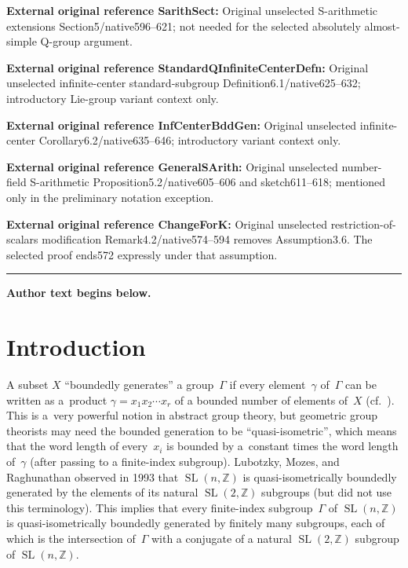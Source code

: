 \documentclass[11pt]{article}
\numberwithin{equation}{section}
\newcommand{\ZZ}{\mathbb{Z}}
\DeclareMathOperator{\SL}{SL}
\numberwithin{equation}{section}
\theoremstyle{definition}
\begin{document}
\noindent\textbf{External original reference SarithSect:} Original unselected S-arithmetic extensions Section5/native596–621; not needed for the selected absolutely almost-simple Q-group argument.\par
\noindent\textbf{External original reference StandardQInfiniteCenterDefn:} Original unselected infinite-center standard-subgroup Definition6.1/native625–632; introductory Lie-group variant context only.\par
\noindent\textbf{External original reference InfCenterBddGen:} Original unselected infinite-center Corollary6.2/native635–646; introductory variant context only.\par
\noindent\textbf{External original reference GeneralSArith:} Original unselected number-field S-arithmetic Proposition5.2/native605–606 and sketch611–618; mentioned only in the preliminary notation exception.\par
\noindent\textbf{External original reference ChangeForK:} Original unselected restriction-of-scalars modification Remark4.2/native574–594 removes Assumption3.6. The selected proof ends572 expressly under that assumption.\par
\medskip\hrule\medskip\noindent\textbf{Author text begins below.}\par

\section{Introduction} \label{IntroSect}

A subset $X$ ``boundedly generates'' a group~$\Gamma$ if every element~$\gamma$ of~$\Gamma$ can be written as a~product $\gamma = x_1 x_2 \cdots x_r$ of a bounded number of elements of~$X$ (cf.~\cite[p.~203]{MR1278263}). This is a~very powerful notion in abstract group theory, but geometric group theorists may need the bounded generation to be ``quasi-isometric'', which means that the word length of every~$x_i$ is bounded by a~constant times the word length of~$\gamma$ (after passing to a finite-index subgroup). Lubotzky, Mozes, and Raghunathan \cite[Corollary~3]{MR1244421} observed in 1993 that $\SL(n,\ZZ)$ is quasi-isometrically boundedly generated by the elements of its natural $\SL(2,\ZZ)$ subgroups (but did not use this terminology). This implies that every finite-index subgroup~$\Gamma$ of $\SL(n,\ZZ)$ is quasi-isometrically boundedly generated by finitely many subgroups, each of which is the intersection of~$\Gamma$ with a conjugate of a natural $\SL(2,\ZZ)$ subgroup of $\SL(n,\ZZ)$.
\end{document}
